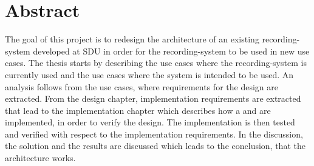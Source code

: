 \chapter{Abstract}

The goal of this project is to redesign the architecture of an existing recording-system developed at SDU in order for the recording-system to be used in new use cases. The thesis starts by describing the use cases where the recording-system is currently used and the use cases where the system is intended to be used. An analysis follows from the use cases, where requirements for the design are extracted. From the design chapter, implementation requirements are extracted that lead to the implementation chapter which describes how a \pub{} and \sub{} are implemented, in order to verify the design. The implementation is then tested and verified with respect to the implementation requirements. In the discussion, the solution and the results are discussed which leads to the conclusion, that the architecture works.
\newpage

